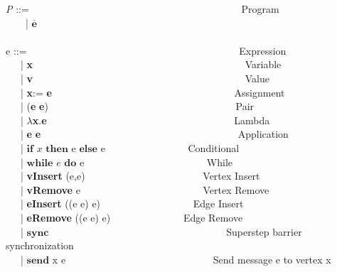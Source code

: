 \begin{frame}
  \tiny{
    \textit{P} ::= \ \ \ \ \ \ \ \ \ \ \ \ \ \ \ \ \ \ \ \ \ \ \ \ \ \ \ \ \ \ \ \ \ \ \ \ \ \ \ \ \ \ Program \\
    \ \ \ \  | $\overline {\textbf{e}}$ \\
\ \\
  e ::= \ \ \ \ \ \ \ \ \ \ \ \ \ \ \ \ \ \ \ \ \ \ \ \ \ \ \ \ \ \ \ \ \ \ \ \ \ \ \ \ \ \ Expression \\
  \ \ \ | \textbf{x} \ \ \ \ \ \ \ \ \ \ \  \ \ \ \ \ \ \ \ \ \ \ \ \ \ \ \ \ \ \ \ \ \ \ \ \ \ \ \ \ \ \ Variable \\
  \ \ \ | \textbf{v}  \ \ \ \ \ \ \ \ \ \ \ \  \ \ \ \ \ \ \ \ \ \ \ \ \ \ \ \ \ \ \ \ \ \ \ \ \ \ \ \ \ \ Value \\
  \ \ \ | \textbf{x}:= \textbf{e}   \ \ \ \ \ \ \ \ \ \ \ \  \ \ \ \ \ \ \ \ \ \ \ \ \ \ \ \ \ \ \ \ \ \ \ \ Assignment \\
  \ \ \ | (\textbf{e} \textbf{e})   \ \ \ \ \ \ \ \ \ \ \  \ \ \ \ \ \ \ \ \ \ \ \ \ \ \ \ \ \ \ \ \ \ \ \ \ \ Pair \\
  \ \ \ | $\lambda$\textbf{x}.\textbf{e}  \ \ \ \ \ \ \ \ \ \ \  \ \ \ \ \ \ \ \ \ \ \ \ \ \ \ \ \ \ \ \ \ \ \ \ \ \ Lambda \\
  \ \ \ | \textbf{e} \textbf{e}   \ \ \ \ \ \ \ \ \ \ \  \ \ \ \ \ \ \ \ \ \ \ \ \ \ \ \ \ \ \ \ \ \ \ \ \ \ \ \ Application \\
  \ \ \ |  $\textbf{if}$ $x$ $\textbf{then}$ e $\textbf{else}$ e \ \ \ \ \ \ \ \ \ \ \ \ \ \ \ \ Conditional \\
  \ \ \ |  $\textbf{while}$ $e$ $\textbf{do}$ e \ \ \ \ \ \ \ \ \ \ \ \ \ \ \ \ \ \ \ \ \ \ \ \ While \\
  \ \ \ |  \textbf{vInsert} (e,e)  \ \ \ \ \ \ \ \ \ \ \ \ \ \ \ \ \ \ \ \ \ \ \ Vertex Insert \\
  \ \ \ |  \textbf{vRemove} e \ \ \ \ \ \ \ \ \ \ \ \ \ \ \ \ \ \ \ \ \ \ \ \ Vertex Remove \\
  \ \ \ |  \textbf{eInsert} ((e e) e)  \ \ \ \ \ \ \ \ \ \ \ \ \ \ \ \ \ \ Edge Insert \\
  \ \ \ |  \textbf{eRemove} ((e e) e)   \ \ \ \ \ \ \ \ \ \ \ \ \ \ Edge Remove \\
  \ \ \ |  $\textbf{sync}$ \ \ \ \ \ \ \ \ \ \ \ \ \ \ \ \  \ \ \ \ \ \ \ \  \ \ \ \ \ \ \ \ \ \ \  Superstep barrier synchronization\\
  \ \ \ |  $\textbf{send}$ x e \ \ \ \ \ \ \ \ \ \ \ \ \ \ \ \ \ \ \ \ \ \ \ \ \ \ \ \ \  Send message e to vertex x \\
}
\end{frame}
